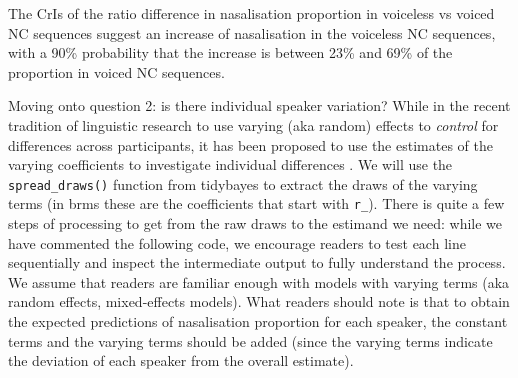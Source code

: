 \documentclass[
  authoryear,
  preprint,
  3p]{elsarticle}
\begin{document}
The CrIs of the ratio difference in nasalisation proportion in voiceless
vs voiced NC sequences suggest an increase of nasalisation in the
voiceless NC sequences, with a 90\% probability that the increase is
between 23\% and 69\% of the proportion in voiced NC sequences.

Moving onto question 2: is there individual speaker variation? While in
the recent tradition of linguistic research to use varying (aka random)
effects to \emph{control} for differences across participants, it has
been proposed to use the estimates of the varying coefficients to
investigate individual differences \citep{tamminga2016}. We will use the
\texttt{spread\_draws()} function from tidybayes \citep{kay2019} to
extract the draws of the varying terms (in brms these are the
coefficients that start with \texttt{r\_}). There is quite a few steps
of processing to get from the raw draws to the estimand we need: while
we have commented the following code, we encourage readers to test each
line sequentially and inspect the intermediate output to fully
understand the process. We assume that readers are familiar enough with
models with varying terms (aka random effects, mixed-effects models).
What readers should note is that to obtain the expected predictions of
nasalisation proportion for each speaker, the constant terms and the
varying terms should be added (since the varying terms indicate the
deviation of each speaker from the overall estimate).
\end{document}
